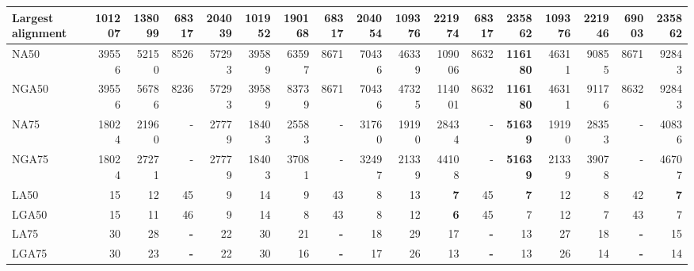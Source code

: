 \documentclass[12pt,a4paper]{article}
\begin{document}
\begin{table}[ht]
\begin{center}
\begin{tabular}{|l*{16}{|r}|}
Largest alignment & 101207 & 138099 & 68317 & 204039 & 101952 & 190168 & 68317 & 204054 & 109376 & 221974 & 68317 & {\bf 235862} & 109376 & 221946 & 69003 & {\bf 235862} \\ \hline
NA50 & 39556 & 52150 & 8526 & 57293 & 39589 & 63597 & 8671 & 70436 & 46339 & 109006 & 8632 & {\bf 116180} & 46311 & 90855 & 8671 & 92843 \\ \hline
NGA50 & 39556 & 56786 & 8236 & 57293 & 39589 & 83739 & 8671 & 70436 & 47325 & 114001 & 8632 & {\bf 116180} & 46311 & 91176 & 8632 & 92843 \\ \hline
NA75 & 18024 & 21960 & - & 27779 & 18403 & 25583 & - & 31760 & 19190 & 28434 & - & {\bf 51639} & 19190 & 28353 & - & 40836 \\ \hline
NGA75 & 18024 & 27271 & - & 27779 & 18403 & 37081 & - & 32497 & 21339 & 44108 & - & {\bf 51639} & 21339 & 39078 & - & 46707 \\ \hline
LA50 & 15 & 12 & 45 & 9 & 14 & 9 & 43 & 8 & 13 & {\bf 7} & 45 & {\bf 7} & 12 & 8 & 42 & {\bf 7} \\ \hline
LGA50 & 15 & 11 & 46 & 9 & 14 & 8 & 43 & 8 & 12 & {\bf 6} & 45 & 7 & 12 & 7 & 43 & 7 \\ \hline
LA75 & 30 & 28 & {\bf -} & 22 & 30 & 21 & {\bf -} & 18 & 29 & 17 & {\bf -} & 13 & 27 & 18 & {\bf -} & 15 \\ \hline
LGA75 & 30 & 23 & {\bf -} & 22 & 30 & 16 & {\bf -} & 17 & 26 & 13 & {\bf -} & 13 & 26 & 14 & {\bf -} & 14 \\ \hline
\end{tabular}
\end{center}
\end{table}
\end{document}
